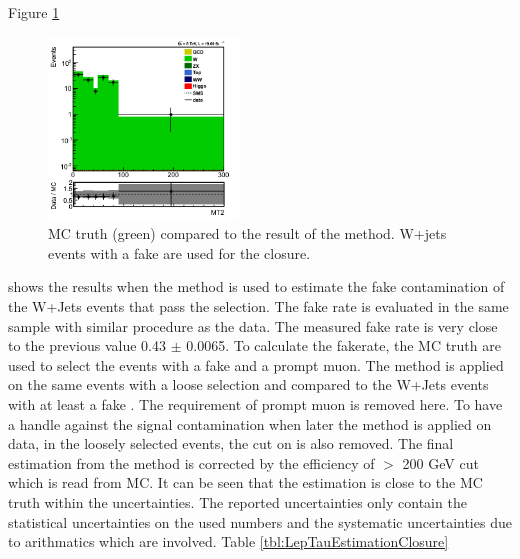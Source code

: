 Figure \ref{fig:LepTauClusure}
\begin{figure}[!Hhtb]
\centering
\includegraphics[width=0.45\textwidth,keepaspectratio=true]{FakeRateMuTau/Estimation_pfWJets_ExtraLepExcl_SameSignWeightedHiggs.png}
\caption{MC truth (green) compared to the result of the method. W+jets events with a fake \Tau are used for the closure.}
\label{fig:LepTauClusure}
\end{figure}
shows the results when the method is used to estimate the fake contamination of the W+Jets events that pass the selection. 
The fake rate is evaluated in the same sample with similar procedure as the data. The measured fake rate  is very close to
the previous value 0.43 $\pm$  0.0065. To calculate the fakerate, the MC truth are used to select the events with a fake \Tau 
and a prompt muon. The method is applied on the same events with a loose \Tau selection and compared to the W+Jets events with at least 
a fake \Tau. The requirement of prompt muon is removed here. To have a handle against the signal contamination when later the method is applied 
on data, in the loosely selected events, the cut on \tauMT is also removed. The final estimation from the method is corrected by the efficiency 
of \tauMT $>$ 200 GeV cut which is read from MC. It can be seen that the estimation is close to the MC truth within the uncertainties.
The reported uncertainties only contain the statistical uncertainties on the used numbers and the systematic uncertainties due to arithmatics 
which are involved. Table \ref{tbl:LepTauEstimationClosure}
